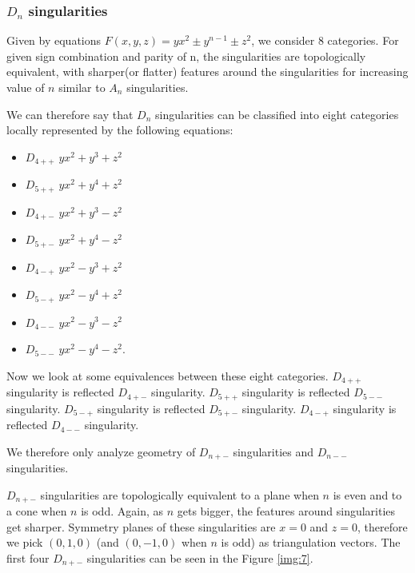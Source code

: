 \subsubsection*{$D_n$ singularities}

Given by equations $F(x,y,z)=yx^2\pm y^{n-1}\pm z^2$, we consider 8 categories.
For given sign combination and parity of n, the singularities are topologically
equivalent, with sharper(or flatter) features around the singularities for increasing
value of $n$ similar to $A_n$ singularities.

We can therefore say that $D_n$ singularities can be classified into eight categories
locally represented by the following equations:
\begin{itemize}
    \item $D_{4++}$ \hspace{5mm} $yx^2 + y^3 + z^2$
    \item $D_{5++}$ \hspace{5mm} $yx^2 + y^4 + z^2$
    \item $D_{4+-}$ \hspace{5mm} $yx^2 + y^3 - z^2$
    \item $D_{5+-}$ \hspace{5mm} $yx^2 + y^4 - z^2$
    \item $D_{4-+}$ \hspace{5mm} $yx^2 - y^3 + z^2$
    \item $D_{5-+}$ \hspace{5mm} $yx^2 - y^4 + z^2$
    \item $D_{4--}$ \hspace{5mm} $yx^2 - y^3 - z^2$
    \item $D_{5--}$ \hspace{5mm} $yx^2 - y^4 - z^2$.
\end{itemize}

Now we look at some equivalences between these eight categories.
$D_{4++}$ singularity is reflected $D_{4+-}$ singularity.
$D_{5++}$ singularity is reflected $D_{5--}$ singularity.
$D_{5-+}$ singularity is reflected $D_{5+-}$ singularity.
$D_{4-+}$ singularity is reflected $D_{4--}$ singularity.

We therefore only analyze geometry of $D_{n+-}$ singularities and
$D_{n--}$ singularities.

$D_{n+-}$ singularities are topologically equivalent to a plane when $n$ is
even and to a cone when $n$ is odd. Again, as $n$ gets bigger, the features
around singularities get sharper. Symmetry planes of these singularities
are $x=0$ and $z=0$, therefore we pick $(0, 1, 0)$ (and $(0, -1, 0)$ when $n$ is odd)
as triangulation vectors. The first four $D_{n+-}$ singularities can be seen in
the Figure \ref{img:7}.

